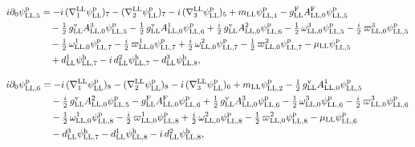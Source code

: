 \documentclass[
  10pt,
]{article}
\begin{document}
\[\begin{aligned}
i\partial_0\psi^{\rm p}_{{\rm LL},5}&=-i\,(\nabla^{\rm LL}_1\psi^{\rm p}_{\rm LL})_7-(\nabla^{\rm LL}_2\psi^{\rm p}_{\rm LL})_7-i\,(\nabla^{\rm LL}_3\psi^{\rm p}_{\rm LL})_5+m_{\rm LL}\psi^{\rm p}_{{\rm LL},1}-g^{\rm F}_{\rm LL}A^{\rm F}_{{\rm LL},0}\psi^{\rm p}_{{\rm LL},5}\\
&\quad -\tfrac{1}{2}\,g^{\rm v}_{\rm LL}A^{3}_{{\rm LL},0}\psi^{\rm p}_{{\rm LL},5}-\tfrac{1}{2}\,g^{\rm v}_{\rm LL}A^{1}_{{\rm LL},0}\psi^{\rm p}_{{\rm LL},6}+\tfrac{i}{2}\,g^{\rm v}_{\rm LL}A^{2}_{{\rm LL},0}\psi^{\rm p}_{{\rm LL},6}-\tfrac{1}{2}\,\omega^{3}_{{\rm LL},0}\psi^{\rm p}_{{\rm LL},5}-\tfrac{i}{2}\,\varpi^{3}_{{\rm LL},0}\psi^{\rm p}_{{\rm LL},5}\\
&\quad -\tfrac{1}{2}\,\omega^{1}_{{\rm LL},0}\psi^{\rm p}_{{\rm LL},7}-\tfrac{i}{2}\,\varpi^{1}_{{\rm LL},0}\psi^{\rm p}_{{\rm LL},7}+\tfrac{i}{2}\,\omega^{2}_{{\rm LL},0}\psi^{\rm p}_{{\rm LL},7}-\tfrac{1}{2}\,\varpi^{2}_{{\rm LL},0}\psi^{\rm p}_{{\rm LL},7}-\mu_{\rm LL}\psi^{\rm p}_{{\rm LL},5}\\
&\quad +d^{1}_{\rm LL}\psi^{\rm h}_{{\rm LL},7}-i\,d^{2}_{\rm LL}\psi^{\rm h}_{{\rm LL},7}-d^{3}_{\rm LL}\psi^{\rm h}_{{\rm LL},8},
\end{aligned}\]

\[\begin{aligned}
i\partial_0\psi^{\rm p}_{{\rm LL},6}&=-i\,(\nabla^{\rm LL}_1\psi^{\rm p}_{\rm LL})_8-(\nabla^{\rm LL}_2\psi^{\rm p}_{\rm LL})_8-i\,(\nabla^{\rm LL}_3\psi^{\rm p}_{\rm LL})_6+m_{\rm LL}\psi^{\rm p}_{{\rm LL},2}-\tfrac{1}{2}\,g^{\rm v}_{\rm LL}A^{1}_{{\rm LL},0}\psi^{\rm p}_{{\rm LL},5}\\
&\quad -\tfrac{i}{2}\,g^{\rm v}_{\rm LL}A^{2}_{{\rm LL},0}\psi^{\rm p}_{{\rm LL},5}-g^{\rm F}_{\rm LL}A^{\rm F}_{{\rm LL},0}\psi^{\rm p}_{{\rm LL},6}+\tfrac{1}{2}\,g^{\rm v}_{\rm LL}A^{3}_{{\rm LL},0}\psi^{\rm p}_{{\rm LL},6}-\tfrac{1}{2}\,\omega^{3}_{{\rm LL},0}\psi^{\rm p}_{{\rm LL},6}-\tfrac{i}{2}\,\varpi^{3}_{{\rm LL},0}\psi^{\rm p}_{{\rm LL},6}\\
&\quad -\tfrac{1}{2}\,\omega^{1}_{{\rm LL},0}\psi^{\rm p}_{{\rm LL},8}-\tfrac{i}{2}\,\varpi^{1}_{{\rm LL},0}\psi^{\rm p}_{{\rm LL},8}+\tfrac{i}{2}\,\omega^{2}_{{\rm LL},0}\psi^{\rm p}_{{\rm LL},8}-\tfrac{1}{2}\,\varpi^{2}_{{\rm LL},0}\psi^{\rm p}_{{\rm LL},8}-\mu_{\rm LL}\psi^{\rm p}_{{\rm LL},6}\\
&\quad -d^{3}_{\rm LL}\psi^{\rm h}_{{\rm LL},7}-d^{1}_{\rm LL}\psi^{\rm h}_{{\rm LL},8}-i\,d^{2}_{\rm LL}\psi^{\rm h}_{{\rm LL},8},
\end{aligned}\]
\end{document}
